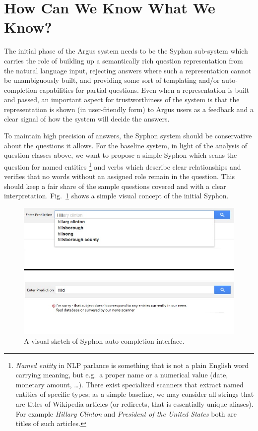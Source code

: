 \documentclass[11pt,a4paper]{article}
\begin{document}
\section{How Can We Know What We Know?}
\label{syphon}

The initial phase of the Argus system needs to be the Syphon sub-system
which carries the role of building up a semantically rich question
representation from the natural language input, rejecting answers where
such a representation cannot be unambiguously built, and providing
some sort of templating and/or auto-completion capabilities for partial
questions.  Even when a representation is built and passed, an important
aspect for trustworthiness of the system is that the representation is
shown (in user-friendly form) to Argus users as a feedback and a clear
signal of how the system will decide the answers.

To maintain high precision of answers, the Syphon system should be
conservative about the questions it allows.  For the baseline system,
in light of the analysis of question classes above,
we want to propose a simple Syphon which scans the question
for named entities%
\footnote{\textit{Named entity} in NLP parlance is something that is
	not a plain English word carrying meaning, but e.g.\ a proper
	name or a numerical value (date, monetary amount, \dots).
	There exist specialized scanners that extract named entities
	of specific types; as a simple baseline, we may consider
	all strings that are titles of Wikipedia articles (or redirects,
	that is essentially unique aliases).  For example
	\textit{Hillary Clinton} and \textit{President of the United States}
	both are titles of such articles.}
and verbs which describe clear relationships
and verifies that no words without an assigned role remain
in the question.  This should keep a fair share of the sample questions
covered and with a clear interpretation.
Fig.~\ref{fig:syphon} shows a simple visual concept of the initial Syphon.

\begin{figure}[ht]
	\centering
	\includegraphics[width=14cm]{syphon_ss.jpg}
	\caption{A visual sketch of Syphon auto-completion interface.}
	\label{fig:syphon}
\end{figure}
\end{document}
